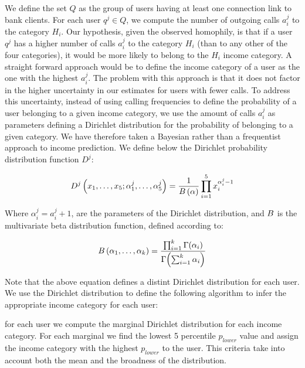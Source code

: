 We define the set $Q$ as the group of users having at least one connection link to bank clients. For each user $q^j \in Q$, we compute the number of outgoing calls $a^j_i$ to the category $H_i$. Our hypothesis, given the observed homophily, is that if a user $q^j$ has a higher number of calls $a^j_i$ to the category $H_i$ (than to any other of the four categories), it would be more likely to belong to the $H_i$ income category. A straight forward approach would be to define the income category of a user as the one with the highest $a^j_i$. The problem with this approach is that it does not factor in the higher uncertainty in our estimates for users with fewer calls. To address this uncertainty, instead of using calling frequencies to define the probability of a user belonging to a given income category, we use the amount of calls $a^j_i$  as parameters defining a Dirichlet distribution for the probability of belonging to a given category. We have therefore taken a Bayesian rather than a frequentist approach to income prediction. We define below the Dirichlet probability distribution function $D^j$:  

\begin{equation}
D^j \left( x_1, \ldots, x_5; \alpha^j_1, \ldots, \alpha^j_5 \right) = \frac{1}{B \left( \alpha \right)} \prod^5_{i = 1} x_i^{\alpha^j_i - 1}
\label{Dirichlet}
\end{equation}

Where $\alpha^j_i = a^j_i +1$, are the parameters of the Dirichlet distribution, and $B$ is the multivariate beta distribution function, defined according to: %

\begin{equation}
B \left( \alpha_1, \ldots, \alpha_k \right) = \frac{\prod^k_{i = 1} \Gamma \! \left( \alpha_i \right)}{\Gamma \! \left( \sum^k_{i = 1} \alpha_i \right) }
\label{Beta} 
\end{equation}


Note that the above equation defines a distint Dirichlet distribution for each user. We use the Dirichlet distribution to define the following algorithm to infer the appropriate income category for each user: 

for each user we compute the marginal Dirichlet distribution for each income category. For each marginal we find the lowest 5 percentile $p_{lower}$ value and assign the income category with the highest $p_{lower}$ to the user. This criteria take into account both the mean and the broadness of the distribution. 
 


